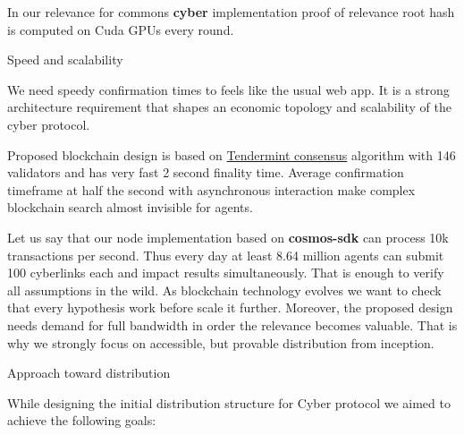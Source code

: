 \documentclass[10pt,oneside]{amsart}
\makeatletter
\def\section{\@startsection{section}{1}%
  \z@{.7\linespacing\@plus\linespacing}{.5\linespacing}%
  {\normalfont\scshape}}%
\newcommand{\code}[1]{\textbf{#1}}
\newenvironment{Figure}
  {\par\medskip\noindent\minipage{\linewidth}}
  {\endminipage\par\medskip}
\makeatother
\begin{document}

In our relevance for commons \code{cyber} implementation proof of relevance root hash is computed on Cuda GPUs every round.

\section{Speed and scalability}\label{Speed and scalability}

We need speedy confirmation times to feels like the usual web app. It is a strong architecture requirement that shapes an economic topology and scalability of the cyber protocol.

Proposed blockchain design is based on 
\href{https://ipfs.io/ipfs/QmaMtD7xDgghqgjN62zWZ5TBGFiEjGQtuZBjJ9sMh816KJ}{Tendermint consensus} algorithm with 146 validators and has very fast 2 second finality time. Average confirmation timeframe at half the second with asynchronous interaction make complex blockchain search almost invisible for agents.

Let us say that our node implementation based on \code{cosmos-sdk} can process 10k transactions per second. Thus every day at least 8.64 million agents can submit 100 cyberlinks each and impact results simultaneously. That is enough to verify all assumptions in the wild. As blockchain technology evolves we want to check that every hypothesis work before scale it further. Moreover, the proposed design needs demand for full bandwidth in order the relevance becomes valuable. That is why we strongly focus on accessible, but provable distribution from inception.

\section{Approach toward distribution}\label{Approach toward distribution}

While designing the initial distribution structure for Cyber protocol we aimed to achieve the following goals:
\end{document}
